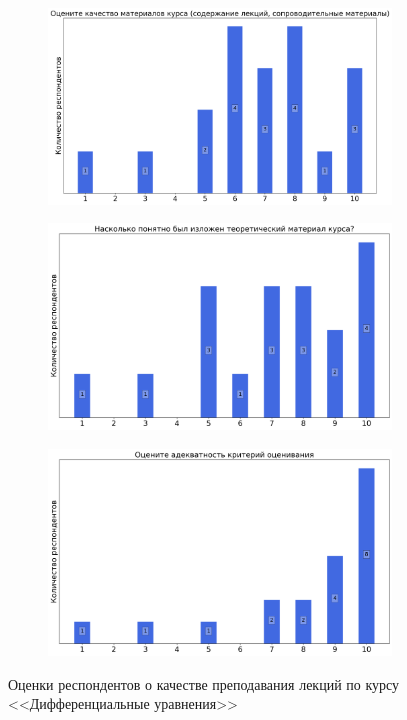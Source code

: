 \begin{figure}[H]
\begin{subfigure}[b]{0.45\textwidth}
			\end{subfigure}
			\begin{subfigure}[b]{0.45\textwidth}
				\centering
				\includegraphics[width=\textwidth]{images/2 course/Дифференциальные уравнения/lecturer-marks-Бишаев А.М.-1.png}
			\end{subfigure}
			\begin{subfigure}[b]{0.45\textwidth}
				\centering
				\includegraphics[width=\textwidth]{images/2 course/Дифференциальные уравнения/lecturer-marks-Бишаев А.М.-2.png}
			\end{subfigure}	
			\begin{subfigure}[b]{0.45\textwidth}
				\centering
				\includegraphics[width=\textwidth]{images/2 course/Дифференциальные уравнения/lecturer-marks-Бишаев А.М.-3.png}
			\end{subfigure}
			\caption{Оценки респондентов о качестве преподавания лекций по курсу <<Дифференциальные уравнения>>}
		\end{figure}

